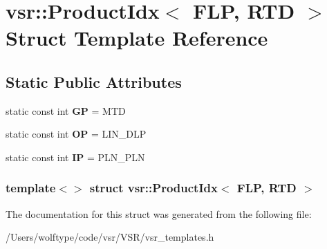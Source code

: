 \hypertarget{structvsr_1_1_product_idx_3_01_f_l_p_00_01_r_t_d_01_4}{\section{vsr\-:\-:Product\-Idx$<$ F\-L\-P, R\-T\-D $>$ Struct Template Reference}
\label{structvsr_1_1_product_idx_3_01_f_l_p_00_01_r_t_d_01_4}
}
\subsection*{Static Public Attributes}
\begin{DoxyCompactItemize}
\item 
\hypertarget{structvsr_1_1_product_idx_3_01_f_l_p_00_01_r_t_d_01_4_a8070b7200bb2b8de13fea6bbe3270d4f}{static const int {\bfseries G\-P} = M\-T\-D}\label{structvsr_1_1_product_idx_3_01_f_l_p_00_01_r_t_d_01_4_a8070b7200bb2b8de13fea6bbe3270d4f}

\item 
\hypertarget{structvsr_1_1_product_idx_3_01_f_l_p_00_01_r_t_d_01_4_a31ae75e45040e97978642d908fb3505c}{static const int {\bfseries O\-P} = L\-I\-N\-\_\-\-D\-L\-P}\label{structvsr_1_1_product_idx_3_01_f_l_p_00_01_r_t_d_01_4_a31ae75e45040e97978642d908fb3505c}

\item 
\hypertarget{structvsr_1_1_product_idx_3_01_f_l_p_00_01_r_t_d_01_4_ae94b1a307bdfd39438bbf430de6e56d9}{static const int {\bfseries I\-P} = P\-L\-N\-\_\-\-P\-L\-N}\label{structvsr_1_1_product_idx_3_01_f_l_p_00_01_r_t_d_01_4_ae94b1a307bdfd39438bbf430de6e56d9}

\end{DoxyCompactItemize}
\subsubsection*{template$<$$>$ struct vsr\-::\-Product\-Idx$<$ F\-L\-P, R\-T\-D $>$}



The documentation for this struct was generated from the following file\-:\begin{DoxyCompactItemize}
\item 
/\-Users/wolftype/code/vsr/\-V\-S\-R/vsr\-\_\-templates.\-h\end{DoxyCompactItemize}
